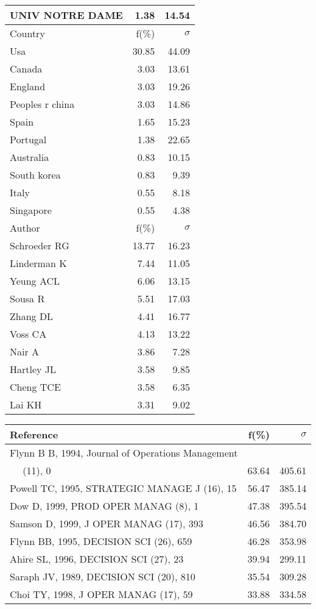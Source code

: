 \documentclass[a4paper,11pt]{report}
\begin{document}
\begin{landscape}
\begin{table}[!ht]
{\begin{tabular}{|l r r|}
UNIV NOTRE DAME & 1.38 & 14.54\\
\hline
\hline
Country & f(\%) & $\sigma$\\
\hline
Usa & 30.85 & 44.09\\
Canada & 3.03 & 13.61\\
England & 3.03 & 19.26\\
Peoples r china & 3.03 & 14.86\\
Spain & 1.65 & 15.23\\
Portugal & 1.38 & 22.65\\
Australia & 0.83 & 10.15\\
South korea & 0.83 & 9.39\\
Italy & 0.55 & 8.18\\
Singapore & 0.55 & 4.38\\
\hline
\hline
Author & f(\%) & $\sigma$\\
\hline
Schroeder RG & 13.77 & 16.23\\
Linderman K & 7.44 & 11.05\\
Yeung ACL & 6.06 & 13.15\\
Sousa R & 5.51 & 17.03\\
Zhang DL & 4.41 & 16.77\\
Voss CA & 4.13 & 13.22\\
Nair A & 3.86 & 7.28\\
Hartley JL & 3.58 & 9.85\\
Cheng TCE & 3.58 & 6.35\\
Lai KH & 3.31 & 9.02\\
\hline
\end{tabular}
}
{\scriptsize\begin{tabular}{|l r r|}
\hline
Reference & f(\%) & $\sigma$\\
\hline
Flynn B B, 1994, Journal of Operations Management &  & \\
$\quad$ (11), 0 & 63.64 & 405.61\\
Powell TC, 1995, STRATEGIC MANAGE J (16), 15 & 56.47 & 385.14\\
Dow D, 1999, PROD OPER MANAG (8), 1 & 47.38 & 395.54\\
Samson D, 1999, J OPER MANAG (17), 393 & 46.56 & 384.70\\
Flynn BB, 1995, DECISION SCI (26), 659 & 46.28 & 353.98\\
Ahire SL, 1996, DECISION SCI (27), 23 & 39.94 & 299.11\\
Saraph JV, 1989, DECISION SCI (20), 810 & 35.54 & 309.28\\
Choi TY, 1998, J OPER MANAG (17), 59 & 33.88 & 334.58\\

\end{tabular}}
\end{table}
\end{landscape}
\end{document}
